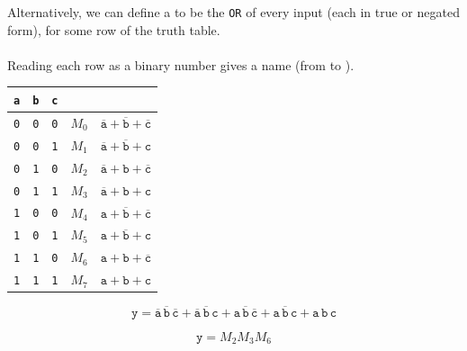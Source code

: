 \documentclass[mathserif, handout]{beamer}
\newcommand{\ttab}[1]{\texttt{#1}}
\begin{document}
\begin{frame}
Alternatively, we can define a  to be the \texttt{OR} of every input (each in true or negated form), for some row of the truth table.
\\~\\
Reading each row as a binary number gives a name (from  to ).\\[2mm]
\begin{center}
    \renewcommand{\arraystretch}{1.1}
    {\small
    \begin{tabular}{ccc|cC}
      \ttab{a} & \ttab{b} & \ttab{c} &  &  \\ \hline
      \ttab{0} & \ttab{0} & \ttab{0} & $M_0$ & $\overline{\ttab{a}}+\overline{\ttab{b}}+\overline{\ttab{c}}$ \\
      \ttab{0} & \ttab{0} & \ttab{1} & $M_1$ & $\overline{\ttab{a}}+\overline{\ttab{b}}+\ttab{c}$ \\
      \ttab{0} & \ttab{1} & \ttab{0} & $M_2$ & $\overline{\ttab{a}}+\ttab{b}+\overline{\ttab{c}}$ \\
      \ttab{0} & \ttab{1} & \ttab{1} & $M_3$ & $\overline{\ttab{a}}+\ttab{b}+\ttab{c}$ \\
      \ttab{1} & \ttab{0} & \ttab{0} & $M_4$ & $\ttab{a}+\overline{\ttab{b}}+\overline{\ttab{c}}$ \\
      \ttab{1} & \ttab{0} & \ttab{1} & $M_5$ & $\ttab{a}+\overline{\ttab{b}}+\ttab{c}$ \\
      \ttab{1} & \ttab{1} & \ttab{0} & $M_6$ & $\ttab{a}+\ttab{b}+\overline{\ttab{c}}$ \\
      \ttab{1} & \ttab{1} & \ttab{1} & $M_7$ & $\ttab{a}+\ttab{b}+\ttab{c}$ \\
    \end{tabular}}
  \end{center}
\[
\ttab{y} = \overline{\ttab{a}}\,\overline{\ttab{b}}\,\overline{\ttab{c}} + \overline{\ttab{a}}\,\overline{\ttab{b}}\,\ttab{c} + \ttab{a}\,\overline{\ttab{b}}\,\overline{\ttab{c}} + \ttab{a}\,\overline{\ttab{b}}\,\ttab{c} + \ttab{a}\,\ttab{b}\,\ttab{c}
\]
\begin{center}\vspace{-2mm}
\end{center}\vspace{-2mm}
\[
\ttab{y} = M_2M_3M_6
\]
\end{frame}
\end{document}
